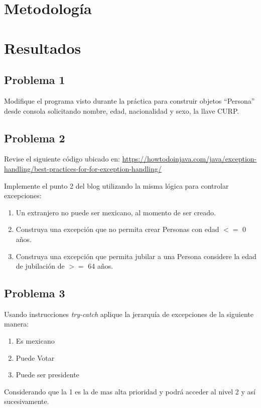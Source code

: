 \documentclass[11pt, twocolumn]{article}
\begin{document}
  \section*{Metodología}


  \section*{Resultados}
  \subsection*{Problema 1}
  Modifique el programa visto durante la práctica para construir objetos ``Persona'' desde consola solicitando nombre, edad, nacionalidad y sexo, la llave CURP.


  \subsection*{Problema 2}
  Revise el siguiente código ubicado en: \url{https://howtodoinjava.com/java/exception-handling/best-practices-for-for-exception-handling/}

  Implemente el punto 2 del blog utilizando la misma lógica para controlar excepciones:

  \begin{enumerate}[label=\alph*)]
    \item Un extranjero no puede ser mexicano, al momento de ser creado.
    \item Construya una excepción que no permita crear Personas con edad $<=$ 0 años.
    \item Construya una excepción que permita jubilar a una Persona considere la edad de jubilación de $>=$ 64 años.
  \end{enumerate}
  

  \subsection*{Problema 3}
  Usando instrucciones \textit{try-catch} aplique la jerarquía de excepciones de la siguiente manera:

  \begin{enumerate}
    \item Es mexicano
    \item Puede Votar
    \item Puede ser presidente
  \end{enumerate}

  Considerando que la 1 es la de mas alta prioridad y podrá acceder al nivel 2 y así sucesivamente.
\end{document}
